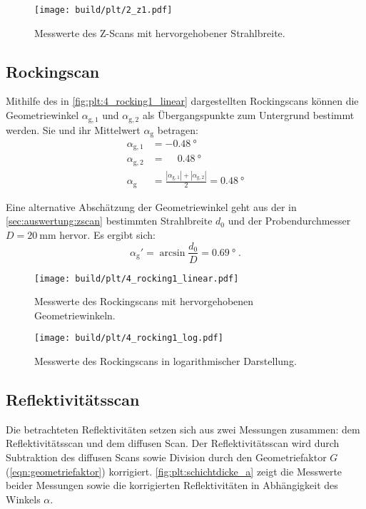 \begin{figure}
    \centering
    \texttt{[image: build/plt/2\_z1.pdf]}
    \caption{Messwerte des Z-Scans mit hervorgehobener Strahlbreite.}
    \label{fig:plt:2_z1}
\end{figure}


\FloatBarrier
\subsection{Rockingscan} \label{sec:auswertung:rockingscan}
Mithilfe des in \autoref{fig:plt:4_rocking1_linear}
dargestellten Rockingscans
können die Geometriewinkel $\alpha_{\text{g}, 1}$ und $\alpha_{\text{g}, 2}$
als Übergangspunkte zum Untergrund bestimmt werden.
Sie und ihr Mittelwert $\alpha_\text{g}$ betragen:
\begin{align*}
    \alpha_{\text{g}, 1} &= \SI{-0.48}{\degree} \\
    \alpha_{\text{g}, 2} &= \phantom{-} \SI{0.48}{\degree} \\
    \alpha_\text{g} &= \frac{|\alpha_{\text{g}, 1}| + |\alpha_{\text{g}, 2}|}{2}
        = \SI{0.48}{\degree}
\end{align*}

Eine alternative Abschätzung der Geometriewinkel
geht aus der in \autoref{sec:auswertung:zscan} bestimmten Strahlbreite $d_0$ und der Probendurchmesser $D = \SI{20}{\milli\meter}$ hervor.
Es ergibt sich:
\[
    \alpha_\text{g}' = \arcsin{\frac{d_0}{D}}
    = \SI{0.69}{\degree} \; .
\]

\begin{figure}
    \centering
    \texttt{[image: build/plt/4\_rocking1\_linear.pdf]}
    \caption{Messwerte des Rockingscans mit hervorgehobenen Geometriewinkeln.}
    \label{fig:plt:4_rocking1_linear}
\end{figure}

\begin{figure}
    \centering
    \texttt{[image: build/plt/4\_rocking1\_log.pdf]}
    \caption{Messwerte des Rockingscans in logarithmischer Darstellung.}
    \label{fig:plt:4_rocking1_log}
\end{figure}


\FloatBarrier
\subsection{Reflektivitätsscan} \label{sec:auswertung:schichtdicke}
Die betrachteten Reflektivitäten setzen sich aus zwei Messungen zusammen:
dem Reflektivitätsscan und dem diffusen Scan.
Der Reflektivitätsscan wird durch
    Subtraktion des diffusen Scans sowie
    Division durch den Geometriefaktor $G$ (\autoref{eqn:geometriefaktor})
korrigiert.
\autoref{fig:plt:schichtdicke_a} zeigt die Messwerte beider Messungen sowie die korrigierten Reflektivitäten
in Abhängigkeit des
Winkels $\alpha$.

